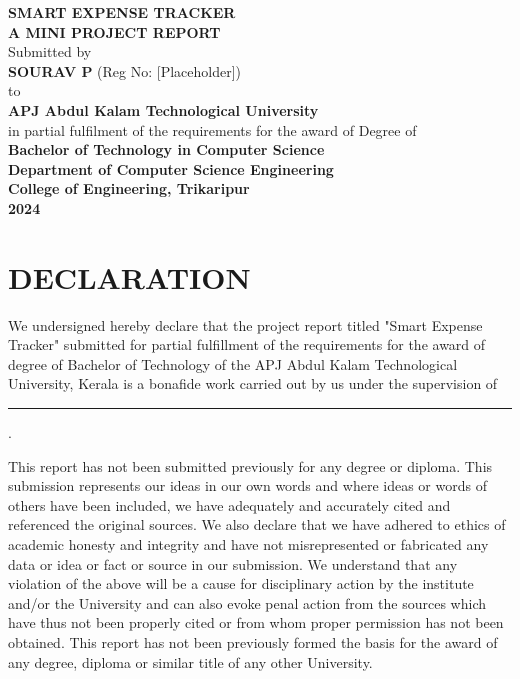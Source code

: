 \documentclass[12pt,a4paper]{article}
\begin{document}
\begin{titlepage}
    \centering
    \vspace*{1cm}
    {\Huge \textbf{SMART EXPENSE TRACKER}} \\
    \vspace{1.5cm}
    {\Large \textbf{A MINI PROJECT REPORT}} \\
    \vspace{2cm}
    Submitted by \\
    \vspace{0.5cm}
    {\large \textbf{SOURAV P} (Reg No: [Placeholder])} \\
    \vspace{2cm}
    to \\
    \vspace{0.5cm}
    {\large \textbf{APJ Abdul Kalam Technological University}} \\
    \vspace{1.5cm}
    in partial fulfilment of the requirements for the award of Degree of \\
    \vspace{0.5cm}
    {\large \textbf{Bachelor of Technology in Computer Science}} \\
    \vfill
    \textbf{Department of Computer Science Engineering} \\
    \textbf{College of Engineering, Trikaripur} \\
    \textbf{2024}
\end{titlepage}

\newpage

\section*{DECLARATION}
We undersigned hereby declare that the project report titled "Smart Expense Tracker" submitted for partial fulfillment of the requirements for the award of degree of Bachelor of Technology of the APJ Abdul Kalam Technological University, Kerala is a bonafide work carried out by us under the supervision of \rule{3cm}{0.4pt}.

This report has not been submitted previously for any degree or diploma. This submission represents our ideas in our own words and where ideas or words of others have been included, we have adequately and accurately cited and referenced the original sources. We also declare that we have adhered to ethics of academic honesty and integrity and have not misrepresented or fabricated any data or idea or fact or source in our submission. We understand that any violation of the above will be a cause for disciplinary action by the institute and/or the University and can also evoke penal action from the sources which have thus not been properly cited or from whom proper permission has not been obtained. This report has not been previously formed the basis for the award of any degree, diploma or similar title of any other University.
\end{document}
